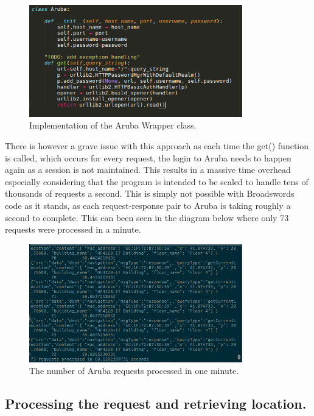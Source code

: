 \documentclass{article}
\begin{document}
\newpage
\begin{figure}[ht]
  \includegraphics[width=350px]{Images/Get_Function.png}
  \caption{Implementation of the Aruba Wrapper class.}
  \label{get() function.}
\end{figure}

\begin{flushleft}
There is however a grave issue with this approach as each time the get() function is called, which occurs for every request, the login to Aruba needs to happen again as a session is not maintained. This results in a massive time overhead especially considering that the program is intended to be scaled to handle tens of thousands of requests a second. This is simply not possible with Broadswords code as it stands, as each request-response pair to Aruba is taking roughly a second to complete. This can been seen in the diagram below where only 73 requests were processed in a minute.
\end{flushleft}

\begin{figure}[ht]
  \includegraphics[width=350px]{Images/Aruba_Returns.png}
  \caption{The number of Aruba requests processed in one minute.}
  \label{Terminal output.}
\end{figure}



\newpage
\subsection{Processing the request and retrieving location.}
\end{document}
